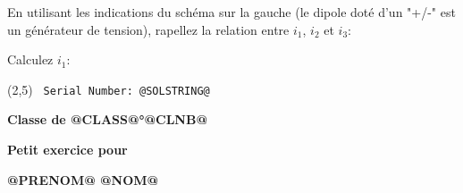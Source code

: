 \documentclass[11pt] {article}
\begin{document}
En utilisant les indications du schéma sur la gauche (le dipole doté d'un "+/-" est un générateur de tension), rapellez la relation entre $i_1$, $i_2$ et $i_3$:
\begin{flushright}
\begin{EnvQuadrillage}[NbCarreaux=14x1,Grille=Seyes,Marge=1]
\end{EnvQuadrillage}
\end{flushright}

Calculez $i_1$:
\begin{flushright}
\begin{EnvQuadrillage}[NbCarreaux=14x1,Grille=Seyes,Marge=1]
\end{EnvQuadrillage}
\end{flushright}


\begin{textblock}{1}(2,5)
    \texttt{\tiny Serial Number: @SOLSTRING@}
\end{textblock}

\pagebreak


\thispagestyle{empty}

{\large \textbf{Classe de @CLASS@°@CLNB@}}
\hfill

{\Large \textbf{Petit exercice pour}}
\hfill

\begin{center}
{\Huge \textbf{@PRENOM@ @NOM@}}
\end{center}
\end{document}
